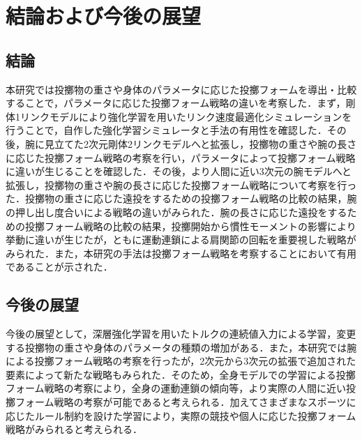 \chapter[結論および今後の展望]{結論および今後の展望}

\section{結論}
本研究では投擲物の重さや身体のパラメータに応じた投擲フォームを導出・比較することで，パラメータに応じた投擲フォーム戦略の違いを考察した．まず，剛体1リンクモデルにより強化学習を用いたリンク速度最適化シミュレーションを行うことで，自作した強化学習シミュレータと手法の有用性を確認した．その後，腕に見立てた2次元剛体2リンクモデルへと拡張し，投擲物の重さや腕の長さに応じた投擲フォーム戦略の考察を行い，パラメータによって投擲フォーム戦略に違いが生じることを確認した．その後，より人間に近い3次元の腕モデルへと拡張し，投擲物の重さや腕の長さに応じた投擲フォーム戦略について考察を行った．投擲物の重さに応じた遠投をするための投擲フォーム戦略の比較の結果，腕の押し出し度合いによる戦略の違いがみられた．腕の長さに応じた遠投をするための投擲フォーム戦略の比較の結果，投擲開始から慣性モーメントの影響により挙動に違いが生じたが，ともに運動連鎖による肩関節の回転を重要視した戦略がみられた．また，本研究の手法は投擲フォーム戦略を考察することにおいて有用であることが示された．

\section{今後の展望}
今後の展望として，深層強化学習を用いたトルクの連続値入力による学習，変更する投擲物の重さや身体のパラメータの種類の増加がある．また，本研究では腕による投擲フォーム戦略の考察を行ったが，2次元から3次元の拡張で追加された要素によって新たな戦略もみられた．そのため，全身モデルでの学習による投擲フォーム戦略の考察により，全身の運動連鎖の傾向等，より実際の人間に近い投擲フォーム戦略の考察が可能であると考えられる．加えてさまざまなスポーツに応じたルール制約を設けた学習により，実際の競技や個人に応じた投擲フォーム戦略がみられると考えられる．
